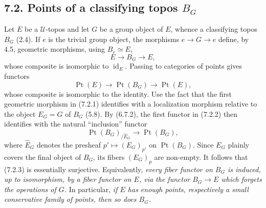 \documentclass[11pt]{article}
\newcommand{\U}{\mathcal{U}}
\newcommand{\id}{\operatorname{id}}
\newcommand{\Ppoint}{\operatorname{Pt}}
\begin{document}
\subsection*{7.2. Points of a classifying topos \(B_G\)}

Let \(E\) be a \(\U\)-topos and let \(G\) be a group object of \(E\), whence a classifying topos \(B_G\) (2.4). If \(e\) is the trivial group object, the morphisms \(e\to G\to e\) define, by 4.5, geometric morphisms, using \(B_e\simeq E\),
\begin{equation*}
E\longrightarrow B_G\longrightarrow E,\tag{7.2.1}
\end{equation*}
whose composite is isomorphic to \(\id_E\). Passing to categories of points gives functors
\begin{equation*}
\Ppoint(E)\longrightarrow\Ppoint(B_G)\longrightarrow\Ppoint(E),\tag{7.2.2}
\end{equation*}
whose composite is isomorphic to the identity. Use the fact that the first geometric morphism in (7.2.1) identifies with a localization morphism relative to the object \(E_G=G\) of \(B_G\) (5.8). By (6.7.2), the first functor in (7.2.2) then identifies with the natural ``inclusion'' functor
\begin{equation*}
\Ppoint(B_G)_{/\widehat E_G}\longrightarrow\Ppoint(B_G),\tag{7.2.3}
\end{equation*}
where \(\widehat E_G\) denotes the presheaf \(p'\mapsto (E_G)_{p'}\) on \(\Ppoint(B_G)\). Since \(E_G\) plainly covers the final object of \(B_G\), its fibers \((E_G)_p\) are non-empty. It follows that (7.2.3) is essentially surjective. Equivalently, \emph{every fiber functor on \(B_G\) is induced, up to isomorphism, by a fiber functor on \(E\), via the functor \(B_G\to E\) which forgets the operations of \(G\).} In particular, \emph{if \(E\) has enough points, respectively a small conservative family of points, then so does \(B_G\).}
\end{document}
